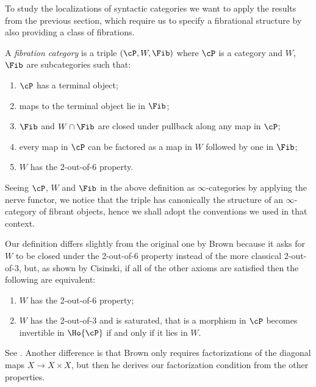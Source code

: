To study the localizations of syntactic categories we want to apply
the results from the previous section, which require us to specify a
fibrational structure by also providing a class
of fibrations.

\begin{defn}\label{fibcats}
  A \emph{fibration category} is a triple $(\cP,W,\Fib)$ where $\cP$ is a
  category and $W$, $\Fib$ are subcategories such that:
  \begin{enumerate}
    \item $\cP$ has a terminal object;
    \item maps to the terminal object lie in $\Fib$;
    \item $\Fib$ and $W\cap \Fib$ are closed under pullback along any map in $\cP$;
    \item every map in $\cP$ can be factored as a map in $W$ followed by one in
      $\Fib$;
    \item $W$ has the 2-out-of-6 property.
  \end{enumerate}
\end{defn}

\begin{rmk}
  Seeing $\cP$, $W$ and $\Fib$ in the above definition as $\infty$-categories by
  applying the nerve functor, we
  notice that the triple has canonically the structure of an $\infty$-category
  of fibrant objects, hence we shall adopt the conventions we used in that
  context.
\end{rmk}

\begin{rmk}
  Our definition differs slightly from the original one by Brown
  because it asks for $W$ to be closed under the 2-out-of-6 property
  instead of the more classical 2-out-of-3, but, as shown by
  Cisinski, if all of
  the other axioms are satisfied then the following are equivalent:
  \begin{enumerate}
    \item $W$ has the 2-out-of-6 property;
    \item $W$ has the 2-out-of-3 and is saturated, that is a morphism in $\cP$
      becomes invertible in $\Ho{\cP}$ if and only if it lies in $W$.
  \end{enumerate}
  See \cite[Thm.~7.2.7]{RB06}. Another difference is that Brown only requires
  factorizations of the diagonal maps $X\rightarrow X\times X$, but then he
  derives our factorization condition from the other properties.
\end{rmk}

